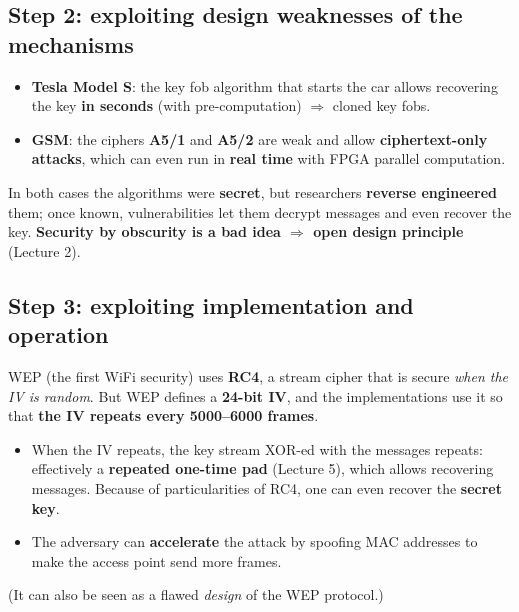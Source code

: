 \subsection{Step 2: exploiting design weaknesses of the mechanisms}

\begin{exbox}[title={Weak cryptographic primitives}]
\begin{itemize}
  \item \textbf{Tesla Model S}: the key fob algorithm that starts the car allows recovering the
        key \textbf{in seconds} (with pre-computation) $\Rightarrow$ cloned key fobs.
  \item \textbf{GSM}: the ciphers \textbf{A5/1} and \textbf{A5/2} are weak and allow
        \textbf{ciphertext-only attacks}, which can even run in \textbf{real time} with FPGA
        parallel computation.
\end{itemize}
In both cases the algorithms were \textbf{secret}, but researchers \textbf{reverse engineered}
them; once known, vulnerabilities let them decrypt messages and even recover the key.
\textbf{Security by obscurity is a bad idea $\Rightarrow$ open design principle} (Lecture 2).
\end{exbox}

\subsection{Step 3: exploiting implementation and operation}

\begin{exbox}[title={Bad operation decisions: WEP's use of RC4}]
WEP (the first WiFi security) uses \textbf{RC4}, a stream cipher that is secure \emph{when the IV is
random}. But WEP defines a \textbf{24-bit IV}, and the implementations use it so that \textbf{the
IV repeats every 5000--6000 frames}.
\begin{itemize}
  \item When the IV repeats, the key stream XOR-ed with the messages repeats: effectively a
        \textbf{repeated one-time pad} (Lecture 5), which allows recovering messages. Because of
        particularities of RC4, one can even recover the \textbf{secret key}.
  \item The adversary can \textbf{accelerate} the attack by spoofing MAC addresses to make the
        access point send more frames.
\end{itemize}
(It can also be seen as a flawed \emph{design} of the WEP protocol.)
\end{exbox}

